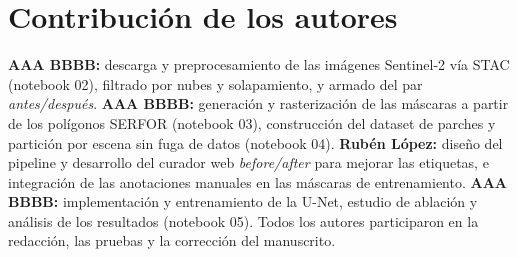 \documentclass[onecolumn,conference]{IEEEtran}
\begin{document}
\section*{Contribución de los autores}

\textbf{AAA BBBB:} descarga y preprocesamiento de las imágenes Sentinel-2
vía STAC (notebook 02), filtrado por nubes y solapamiento, y armado del par
\emph{antes/después}.
\textbf{AAA BBBB:} generación y rasterización de las máscaras a partir de los
polígonos SERFOR (notebook 03), construcción del dataset de parches y partición
por escena sin fuga de datos (notebook 04).
\textbf{Rubén López:} diseño del pipeline y desarrollo del curador web
\emph{before/after} para mejorar las etiquetas, e integración de las anotaciones
manuales en las máscaras de entrenamiento.
\textbf{AAA BBBB:} implementación y entrenamiento de la U-Net, estudio de
ablación y análisis de los resultados (notebook 05).
Todos los autores participaron en la redacción, las pruebas y la corrección del
manuscrito.


\nocite{*}                  %

\end{document}

